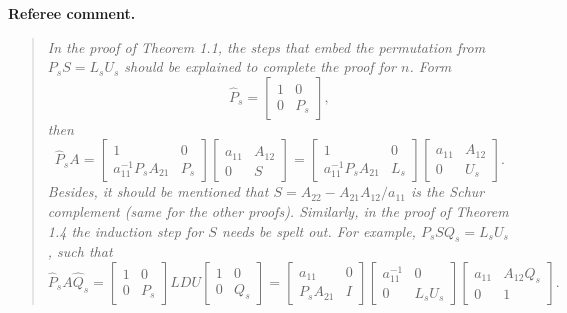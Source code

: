 \documentclass[11pt]{article}
\newenvironment{refereecomment}
{\par\smallskip\noindent\textbf{\color{commentblue}Referee comment.}
\begin{quote}\itshape}
  {
\end{quote}}
\begin{document}
\begin{refereecomment}
  In the proof of Theorem 1.1, the steps that embed the permutation from $P_s S = L_s U_s$ should be explained to complete the proof for $n$. Form
  \[
    \widehat{P}_s =
    \begin{bmatrix}
      1 & 0 \\
      0 & P_s
    \end{bmatrix},
  \]
  then
  \[
    \widehat{P}_s A =
    \begin{bmatrix}
      1 & 0 \\
      a_{11}^{-1} P_s A_{21} & P_s
    \end{bmatrix}
    \begin{bmatrix}
      a_{11} & A_{12} \\
      0 & S
    \end{bmatrix}
    =
    \begin{bmatrix}
      1 & 0 \\
      a_{11}^{-1} P_s A_{21} & L_s
    \end{bmatrix}
    \begin{bmatrix}
      a_{11} & A_{12} \\
      0 & U_s
    \end{bmatrix}.
  \]
  Besides, it should be mentioned that $S = A_{22} - A_{21} A_{12} / a_{11}$ is the Schur complement (same for the other proofs). Similarly, in the proof of Theorem 1.4 the induction step for $S$ needs be spelt out. For example, $P_s S Q_s = L_s U_s$, such that
  \[
    \widehat{P}_s A \widehat{Q}_s =
    \begin{bmatrix}
      1 & 0 \\
      0 & P_s
    \end{bmatrix}
    L D U
    \begin{bmatrix}
      1 & 0 \\
      0 & Q_s
    \end{bmatrix}
    =
    \begin{bmatrix}
      a_{11} & 0 \\
      P_s A_{21} & I
    \end{bmatrix}
    \begin{bmatrix}
      a_{11}^{-1} & 0 \\
      0 & L_s U_s
    \end{bmatrix}
    \begin{bmatrix}
      a_{11} & A_{12} Q_s \\
      0 & 1
    \end{bmatrix}.
  \]
\end{refereecomment}
\end{document}
